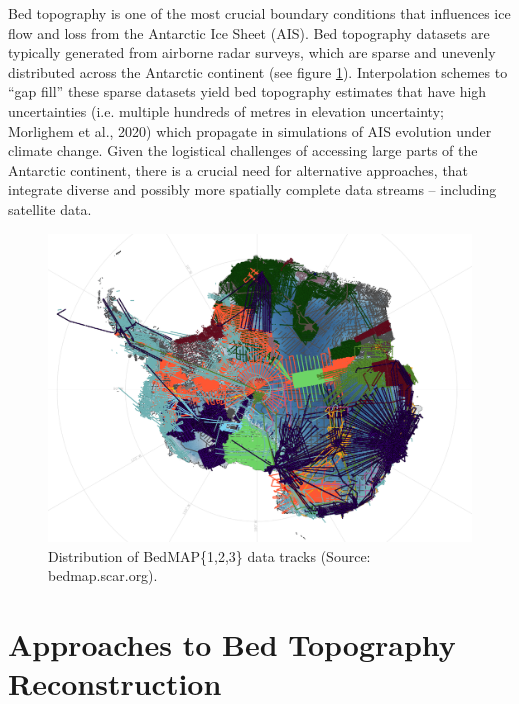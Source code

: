 Bed topography is one of the most crucial boundary conditions that influences ice flow and loss from the Antarctic Ice Sheet (AIS)\cite{Morlighem_2020}. Bed topography datasets are typically generated from airborne radar surveys, which are sparse and unevenly distributed across the Antarctic continent (see figure \ref{fig:BedMAP}). Interpolation schemes to ``gap fill'' these sparse datasets yield bed topography estimates that have high uncertainties (i.e. multiple hundreds of metres in elevation uncertainty; Morlighem et al., 2020) which propagate in simulations of AIS evolution under climate change\cite{Castleman_2022}. Given the logistical challenges of accessing large parts of the Antarctic continent, there is a crucial need for alternative approaches, that integrate diverse and possibly more spatially complete data streams – including satellite data.
\begin{figure}[H] %
    \includegraphics[scale=0.4]{bedmap.png}
    \caption{Distribution of BedMAP\{1,2,3\} data tracks (Source: bedmap.scar.org).}
    \label{fig:BedMAP}
\end{figure}

\section{Approaches to Bed Topography Reconstruction}

